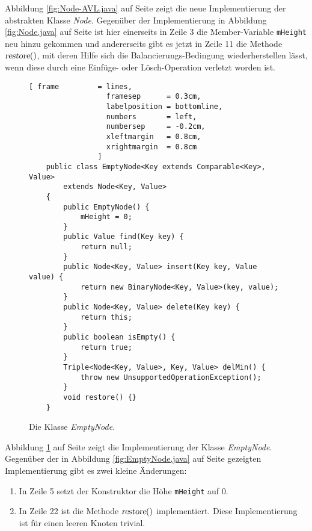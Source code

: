 Abbildung \ref{fig:Node-AVL.java} auf Seite \pageref{fig:Node-AVL.java} zeigt die neue
Implementierung der abstrakten Klasse \textsl{Node}.  Gegen\"uber der Implementierung in Abbildung
\ref{fig:Node.java} auf Seite \pageref{fig:Node.java} ist hier einerseits in Zeile 3 die
Member-Variable \texttt{mHeight} neu hinzu gekommen und andererseits gibt es jetzt in
Zeile 11 die Methode $\textsl{restore}()$, mit deren Hilfe sich die
Balancierungs-Bedingung wiederherstellen l\"asst, wenn diese durch eine Einf\"uge- oder
L\"osch-Operation verletzt worden ist.


\begin{figure}[!ht]
  \centering
\begin{Verbatim}[ frame         = lines, 
                  framesep      = 0.3cm, 
                  labelposition = bottomline,
                  numbers       = left,
                  numbersep     = -0.2cm,
                  xleftmargin   = 0.8cm,
                  xrightmargin  = 0.8cm
                ]
    public class EmptyNode<Key extends Comparable<Key>, Value> 
        extends Node<Key, Value>
    {
        public EmptyNode() {
            mHeight = 0;
        }       
        public Value find(Key key) { 
            return null; 
        }
        public Node<Key, Value> insert(Key key, Value value) {
            return new BinaryNode<Key, Value>(key, value);
        }       
        public Node<Key, Value> delete(Key key) {
            return this;
        }    
        public boolean isEmpty() {
            return true;
        }
        Triple<Node<Key, Value>, Key, Value> delMin() {
            throw new UnsupportedOperationException();
        }
        void restore() {}
    }
\end{Verbatim}
\vspace*{-0.3cm}
  \caption{Die Klasse \textsl{EmptyNode}.}
  \label{fig:EmptyNode-AVL.java}
\end{figure}

Abbildung \ref{fig:EmptyNode-AVL.java} auf Seite \pageref{fig:EmptyNode-AVL.java}
zeigt die Implementierung der Klasse \textsl{EmptyNode}.  Gegen\"uber der in
Abbildung \ref{fig:EmptyNode.java} auf Seite \pageref{fig:EmptyNode.java} gezeigten
Implementierung gibt es zwei kleine \"Anderungen:
\begin{enumerate}
\item In Zeile 5 setzt der Konstruktor die H\"ohe \texttt{mHeight} auf 0.
\item In Zeile 22 ist die Methode $\textsl{restore}()$ implementiert.  Diese
      Implementierung ist f\"ur einen leeren Knoten trivial.
\end{enumerate}

